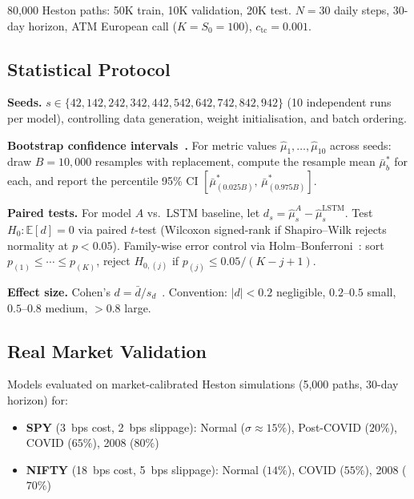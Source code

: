 \documentclass[11pt]{article}
\newcommand{\E}{\mathbb{E}}
\begin{document}
80,000 Heston paths: 50K train, 10K validation, 20K test. $N = 30$ daily steps, 30-day horizon, ATM European call ($K = S_0 = 100$), $c_{\mathrm{tc}} = 0.001$.

\subsection{Statistical Protocol}

\textbf{Seeds.} $s \in \{42, 142, 242, 342, 442, 542, 642, 742, 842, 942\}$ (10 independent runs per model), controlling data generation, weight initialisation, and batch ordering.

\textbf{Bootstrap confidence intervals~\citep{efron1979bootstrap}.}  For metric values $\hat\mu_1,\ldots,\hat\mu_{10}$ across seeds: draw $B=10{,}000$ resamples with replacement, compute the resample mean $\bar\mu^*_b$ for each, and report the percentile 95\% CI $[\bar\mu^*_{(0.025B)},\,\bar\mu^*_{(0.975B)}]$.

\textbf{Paired tests.}  For model $A$ vs.\ LSTM baseline, let $d_s = \hat\mu_s^A - \hat\mu_s^{\mathrm{LSTM}}$.  Test $H_0:\E[d]=0$ via paired $t$-test (Wilcoxon signed-rank if Shapiro--Wilk rejects normality at $p<0.05$).  Family-wise error control via Holm--Bonferroni~\citep{holm1979simple}: sort $p_{(1)}\le\cdots\le p_{(K)}$, reject $H_{0,(j)}$ if $p_{(j)} \le 0.05/(K-j+1)$.

\textbf{Effect size.}  Cohen's $d = \bar d / s_d$~\citep{cohen1988statistical}.  Convention: $|d|<0.2$ negligible, $0.2$--$0.5$ small, $0.5$--$0.8$ medium, $>0.8$ large.

\subsection{Real Market Validation}

Models evaluated on market-calibrated Heston simulations (5,000 paths, 30-day horizon) for:
\begin{itemize}[noitemsep]
    \item \textbf{SPY} (3~bps cost, 2~bps slippage): Normal ($\sigma\!\approx\!15\%$), Post-COVID ($20\%$), COVID ($65\%$), 2008 ($80\%$)
    \item \textbf{NIFTY} (18~bps cost, 5~bps slippage): Normal ($14\%$), COVID ($55\%$), 2008 ($70\%$)
\end{itemize}

\end{document}
